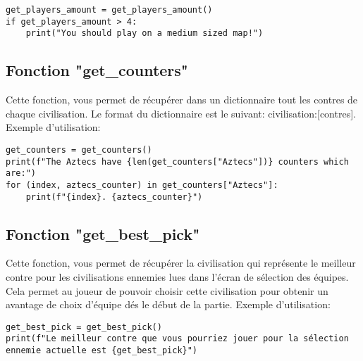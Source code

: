 \begin{verbatim}
get_players_amount = get_players_amount()
if get_players_amount > 4:
    print("You should play on a medium sized map!")
\end{verbatim}

\subsection{Fonction "get\_counters"}
Cette fonction, vous permet de récupérer dans un dictionnaire tout les contres de chaque civilisation. Le format du dictionnaire est le suivant: {civilisation:[contres]}.
Exemple d'utilisation:

\begin{verbatim}
get_counters = get_counters()
print(f"The Aztecs have {len(get_counters["Aztecs"])} counters which are:")
for (index, aztecs_counter) in get_counters["Aztecs"]:
    print(f"{index}. {aztecs_counter}")
\end{verbatim}

\subsection{Fonction "get\_best\_pick"}
Cette fonction, vous permet de récupérer la civilisation qui représente le meilleur contre pour les civilisations ennemies lues dans l'écran de sélection des équipes. Cela permet au joueur de pouvoir choisir cette civilisation pour obtenir un avantage de choix d'équipe dés le début de la partie.
Exemple d'utilisation:

\begin{verbatim}
get_best_pick = get_best_pick()
print(f"Le meilleur contre que vous pourriez jouer pour la sélection ennemie actuelle est {get_best_pick}")
\end{verbatim}